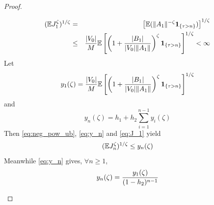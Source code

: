 \documentclass{article}
\theoremstyle{remark}
\begin{document}
\begin{proof}
\begin{enumerate}
      \begin{eqnarray}
        (\mathbb{E} J_1^\zeta)^{1/\zeta} &=&
        \left[
        \mathbb{E} (\|A_1\|^{-\zeta}\mathbf{1}_{\{\tau > n\}})
      \right]^{1/\zeta} \nonumber \\
      &\leq&
      {|V_0|\over M} \mathbb{E} \left[\left(
        1 + {|B_1| \over |V_0| \|A_1\|}
      \right)^\zeta
      \mathbf{1}_{\{\tau > n\}}\right]^{1/\zeta}< \infty
    \label{eq:J_1}
    \end{eqnarray}
    Let
    \[
    y_1(\zeta) = 
    {|V_0|\over M} \mathbb{E} \left[\left(
        1 + {|B_1| \over |V_0| \|A_1\|}
      \right)^\zeta \mathbf{1}_{\{\tau > n\}}\right]^{1/\zeta}
    \]
    and
    \begin{equation}
      \label{eq:y_n}
      y_n(\zeta) = h_1 + h_2 \sum_{i=1}^{n-1} y_i(\zeta)
    \end{equation}
    Then \eqref{eq:neg_pow_ub}, \eqref{eq:y_n} and \eqref{eq:J_1}
    yield
    \begin{equation}
      \label{eq:J_n_2}
      (\mathbb{E} J_n^\zeta)^{1/\zeta} \leq y_n(\zeta)
    \end{equation}
    Meanwhile \eqref{eq:y_n} gives, $\forall n \geq 1$,
    \begin{equation}
      \label{eq:y_n_2}
      y_n(\zeta) = {y_1(\zeta) \over (1 - h_2)^{n-1}}
    \end{equation}


\end{enumerate}
\end{proof}
\end{document}
